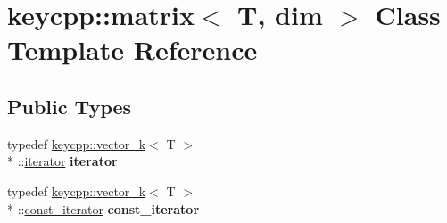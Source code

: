 \hypertarget{classkeycpp_1_1matrix}{\section{keycpp\-:\-:matrix$<$ T, dim $>$ Class Template Reference}
\label{classkeycpp_1_1matrix}
}
\subsection*{Public Types}
\begin{DoxyCompactItemize}
\item 
\hypertarget{classkeycpp_1_1matrix_a3f320a21b7c5af7fe8660724e5f713bd}{typedef \hyperlink{classkeycpp_1_1vector__k}{keycpp\-::vector\-\_\-k}$<$ T $>$\\*
\-::\hyperlink{classkeycpp_1_1_pointer_iterator}{iterator} {\bfseries iterator}}\label{classkeycpp_1_1matrix_a3f320a21b7c5af7fe8660724e5f713bd}

\item 
\hypertarget{classkeycpp_1_1matrix_a6880872af4caf59eab4ccae9122ffd58}{typedef \hyperlink{classkeycpp_1_1vector__k}{keycpp\-::vector\-\_\-k}$<$ T $>$\\*
\-::\hyperlink{classkeycpp_1_1_pointer_iterator}{const\-\_\-iterator} {\bfseries const\-\_\-iterator}}\label{classkeycpp_1_1matrix_a6880872af4caf59eab4ccae9122ffd58}

\end{DoxyCompactItemize}
